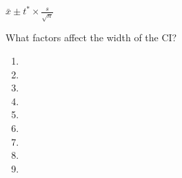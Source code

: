 \begin{frame}
\frametitle{\grp}
$\displaystyle \bar{x} \pm t^{*} \times \frac{s}{\sqrt{n}}$
\begin{clicker}{What factors affect the width of the CI?}
\begin{enumerate}
\item
\item[]
\item[]
\item
\item[]
\item[]
\item
\item[]
\item[]
\end{enumerate}
\end{clicker}
\end{frame}
%
%
%
%
